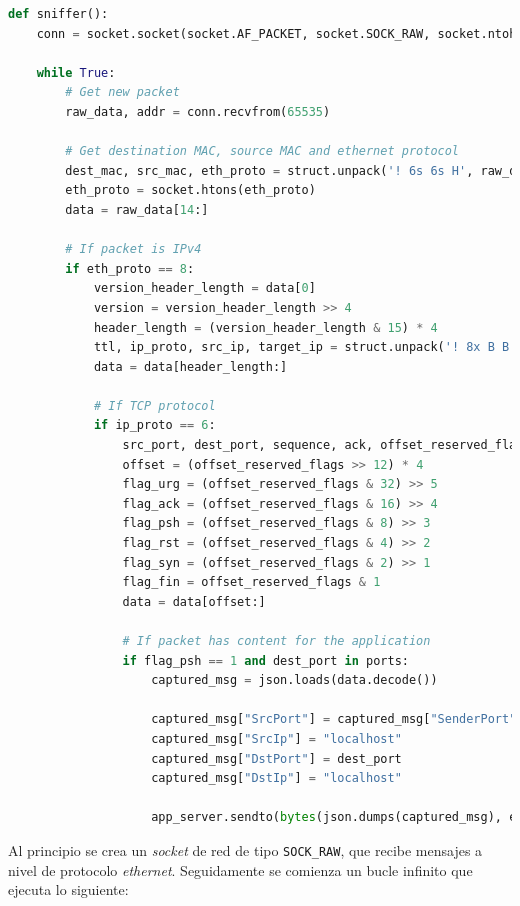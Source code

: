 \begin{lstlisting}[language=Python]
def sniffer():
    conn = socket.socket(socket.AF_PACKET, socket.SOCK_RAW, socket.ntohs(3))
    
    while True:
        # Get new packet
        raw_data, addr = conn.recvfrom(65535)
        
        # Get destination MAC, source MAC and ethernet protocol
        dest_mac, src_mac, eth_proto = struct.unpack('! 6s 6s H', raw_data[:14])
        eth_proto = socket.htons(eth_proto)
        data = raw_data[14:]

        # If packet is IPv4
        if eth_proto == 8:
            version_header_length = data[0]
            version = version_header_length >> 4
            header_length = (version_header_length & 15) * 4
            ttl, ip_proto, src_ip, target_ip = struct.unpack('! 8x B B 2x 4s 4s', data[:20])
            data = data[header_length:]

            # If TCP protocol
            if ip_proto == 6:
                src_port, dest_port, sequence, ack, offset_reserved_flags = struct.unpack('! H H L L H', data[:14])
                offset = (offset_reserved_flags >> 12) * 4
                flag_urg = (offset_reserved_flags & 32) >> 5
                flag_ack = (offset_reserved_flags & 16) >> 4
                flag_psh = (offset_reserved_flags & 8) >> 3
                flag_rst = (offset_reserved_flags & 4) >> 2
                flag_syn = (offset_reserved_flags & 2) >> 1
                flag_fin = offset_reserved_flags & 1
                data = data[offset:]

                # If packet has content for the application
                if flag_psh == 1 and dest_port in ports:
                    captured_msg = json.loads(data.decode())

                    captured_msg["SrcPort"] = captured_msg["SenderPort"]
                    captured_msg["SrcIp"] = "localhost"
                    captured_msg["DstPort"] = dest_port
                    captured_msg["DstIp"] = "localhost"

                    app_server.sendto(bytes(json.dumps(captured_msg), encoding='utf-8'), manager_addr)
\end{lstlisting}

Al principio se crea un \textit{socket} de red de tipo \texttt{SOCK\_RAW}, que recibe mensajes a nivel de protocolo \textit{ethernet}. Seguidamente se comienza un bucle infinito que ejecuta lo siguiente:

